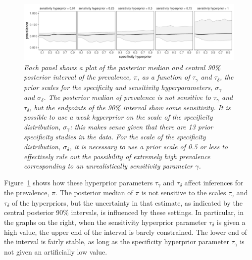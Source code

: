 \documentclass[11pt]{article}
\begin{document}
\begin{figure}
  \centerline{\includegraphics[width=\textwidth]{prior-sensitivity.pdf}}
  \vspace{-.15in}
\caption{\em Each panel shows a plot of the posterior median and central 90\%
  posterior interval of the prevalence, $\pi$, as a function of $\tau_{\gamma}$ and $\tau_{\delta}$, the prior scales for the specificity  and sensitivity
  hyperparameters, $\sigma_{\gamma}$ and $\sigma_{\delta}$.
  The posterior median of prevalence is not sensitive to $\tau_{\gamma}$ and $\tau_{\delta}$, but the endpoints of the 90\% interval show some sensitivity.  It is possible to use a weak hyperprior on the scale of the specificity distribution,  $\sigma_{\gamma}$:  this makes sense given that there are 13 prior specificity studies in the data.  For the scale of the specificity distribution,  $\sigma_{\delta}$, it is necessary to use a prior scale of 0.5 or less to effectively rule out the possibility of extremely high prevalence  corresponding to an unrealistically sensitivity parameter $\gamma$.}\label{prior-sensitivity.fig}
\end{figure}

Figure~\ref{prior-sensitivity.fig} shows how these hyperprior parameters $\tau_{\gamma}$ and $\tau_{\delta}$ affect inferences for the prevalence, $\pi$.
The posterior median of $\pi$ is not sensitive to the scales
 $\tau_{\gamma}$ and $\tau_{\delta}$ of the hyperpriors, but the
uncertainty in that estimate, as indicated by the central posterior 90\%
intervals, is influenced by these settings.  In particular, in the graphs on the right, when the sensitivity hyperprior parameter $\tau_{\delta}$ is given a high value, the upper end of the interval is barely constrained.  The lower end of the interval is fairly stable, as long as the specificity hyperprior parameter $\tau_{\gamma}$ is not given an artificially low value.
\end{document}
